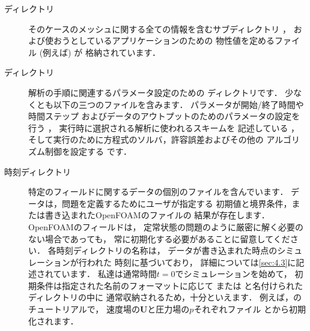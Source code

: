 \begin{description}
 \item[ディレクトリ]
%
%
            そのケースのメッシュに関する全ての情報を含むサブディレクトリ
%
%
            ，
            および使おうとしているアプリケーションのための
            物性値を定めるファイル (例えば) が
            格納されています．
 \item[ディレクトリ]
%
%
            解析の手順に関連するパラメータ設定のための
            ディレクトリです．
            少なくとも以下の三つのファイルを含みます．
            パラメータが開始/終了時間や時間ステップ
            およびデータのアウトプットのためのパラメータの設定を行う
%
%
            ，
            実行時に選択される解析に使われるスキームを
            記述している
%
%
            ，
            そして実行のために方程式のソルバ，許容誤差およびその他の
            アルゴリズム制御を設定する
%
%
            です．
 \item[時刻ディレクトリ]
            特定のフィールドに関するデータの個別のファイルを含んでいます．
            データは，問題を定義するためにユーザが指定する
            初期値と境界条件，または書き込まれたOpenFOAMのファイルの
            結果が存在します．OpenFOAMのフィールドは，
            定常状態の問題のように厳密に解く必要のない場合であっても，
            常に初期化する必要があることに留意してください．
            各時刻ディレクトリの名称は，
            データが書き込まれた時点のシミュレーションが行われた
            時刻に基づいており，
            詳細については\autoref{sec:4.3}に記述されています．
            私達は通常時間$t = 0$でシミュレーションを始めて，
            初期条件は指定された名前のフォーマットに応じて
%
%
            または
%
%
            と名付けられたディレクトリの中に
            通常収納されるため，十分といえます．
            例えば，のチュートリアルで，
            速度場の$\bm{U}$と圧力場の$p$それぞれファイル
            とから初期化されます．
\end{description}



